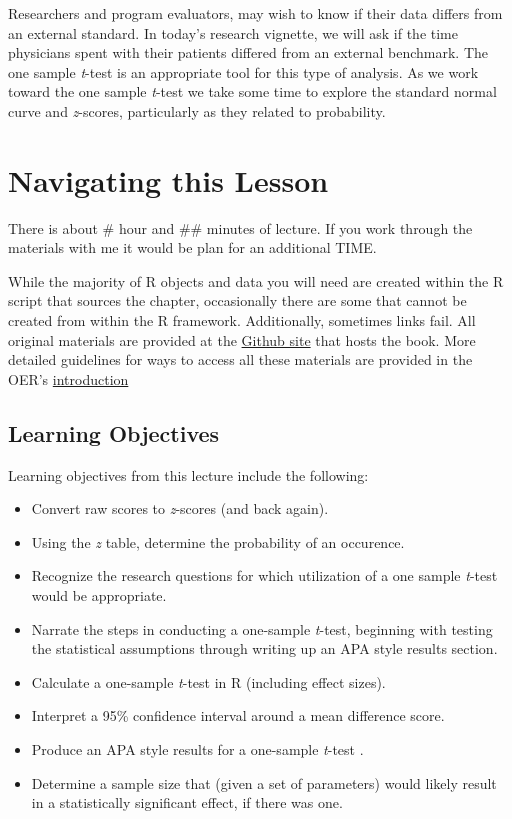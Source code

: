 \documentclass[
  11pt,
]{book}
\providecommand{\tightlist}{%
  \setlength{\itemsep}{0pt}\setlength{\parskip}{0pt}}
\begin{document}
Researchers and program evaluators, may wish to know if their data differs from an external standard. In today's research vignette, we will ask if the time physicians spent with their patients differed from an external benchmark. The one sample \emph{t}-test is an appropriate tool for this type of analysis. As we work toward the one sample \emph{t}-test we take some time to explore the standard normal curve and \emph{z}-scores, particularly as they related to probability.

\hypertarget{navigating-this-lesson-2}{%
\section{Navigating this Lesson}\label{navigating-this-lesson-2}}

There is about \# hour and \#\# minutes of lecture. If you work through the materials with me it would be plan for an additional TIME.

While the majority of R objects and data you will need are created within the R script that sources the chapter, occasionally there are some that cannot be created from within the R framework. Additionally, sometimes links fail. All original materials are provided at the \href{https://github.com/lhbikos/ReCenterPsychStats}{Github site} that hosts the book. More detailed guidelines for ways to access all these materials are provided in the OER's \protect\hyperlink{ReCintro}{introduction}

\hypertarget{learning-objectives-2}{%
\subsection{Learning Objectives}\label{learning-objectives-2}}

Learning objectives from this lecture include the following:

\begin{itemize}
\tightlist
\item
  Convert raw scores to \emph{z}-scores (and back again).
\item
  Using the \emph{z} table, determine the probability of an occurence.
\item
  Recognize the research questions for which utilization of a one sample \emph{t}-test would be appropriate.
\item
  Narrate the steps in conducting a one-sample \emph{t}-test, beginning with testing the statistical assumptions through writing up an APA style results section.
\item
  Calculate a one-sample \emph{t}-test in R (including effect sizes).
\item
  Interpret a 95\% confidence interval around a mean difference score.
\item
  Produce an APA style results for a one-sample \emph{t}-test .
\item
  Determine a sample size that (given a set of parameters) would likely result in a statistically significant effect, if there was one.
\end{itemize}
\end{document}
